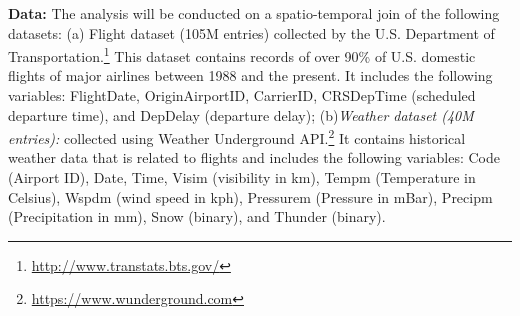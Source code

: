 {\bf Data:} The analysis will be conducted on a spatio-temporal join of the following datasets: (a) Flight dataset (105M entries) collected by the U.S. Department of Transportation.\footnote{\url{http://www.transtats.bts.gov/}} This dataset contains records of over 90\% of U.S. domestic flights of major airlines between 1988 and the present. It includes the following variables: FlightDate, OriginAirportID, CarrierID, CRSDepTime (scheduled departure time), and DepDelay (departure delay); (b){\it Weather dataset (40M entries):} collected using Weather Underground API.\footnote{\url{https://www.wunderground.com}} It contains historical weather data that is related to flights and includes the following variables: Code (Airport ID), Date, Time, Visim (visibility in km), Tempm (Temperature in Celsius), Wspdm (wind speed in kph), Pressurem (Pressure in mBar), Precipm (Precipitation in mm), Snow (binary), and Thunder (binary).

